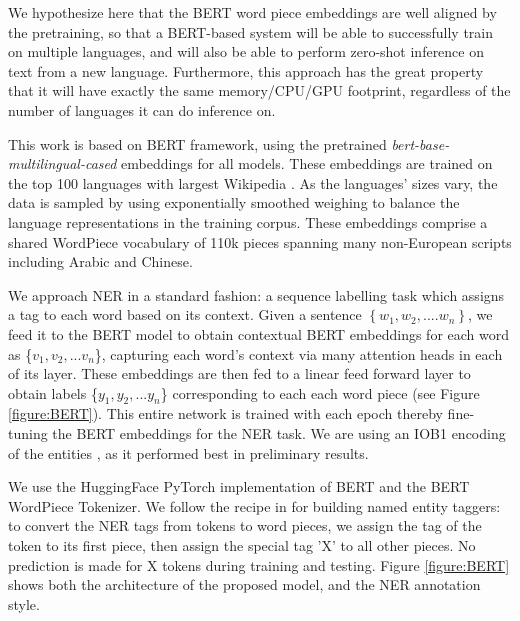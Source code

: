 \documentclass[letterpaper]{article} \usepackage{aaai20}  \usepackage{times}  \usepackage{helvet} \usepackage{courier}  \usepackage[hyphens]{url}  \usepackage{graphicx} \urlstyle{rm} \def\UrlFont{\rm}  \usepackage{graphicx}  \frenchspacing  \setlength{\pdfpagewidth}{8.5in}  \setlength{\pdfpageheight}{11in}  \usepackage{amsmath}
\begin{document}
We hypothesize here that the BERT word piece embeddings are well
aligned by the pretraining, so that a BERT-based system will be able to
successfully train on multiple languages, and will also be able to
perform zero-shot inference on text from a new language. Furthermore,
this approach has the great property that it will have exactly the
same memory/CPU/GPU footprint, regardless of the number of languages
it can do inference on.

This work is based on \cite{BERT18} BERT framework, using the
pretrained \textit{bert-base-multilingual-cased} embeddings for all
models. These embeddings are trained on the top 100 languages with largest
Wikipedia \cite{google-research18:_tensor_bert}. As the languages'
sizes vary, the data is sampled by using exponentially smoothed
weighing to balance the language representations in the training
corpus. These embeddings comprise a shared WordPiece vocabulary
of 110k pieces spanning many non-European scripts including Arabic and Chinese.


We approach NER in a standard fashion: a sequence labelling task which
assigns a tag to each word based on its context. Given a sentence
$\left\{w_{1},w_{2},....w_{n}\right\}$, we feed it to the BERT model
to obtain contextual BERT embeddings for each word as
\{$v_{1},v_{2},...v_{n}$\}, capturing each word's context via many
attention heads in each of its layer. These embeddings are then fed to
a linear feed forward layer to obtain labels
\{$y_{1},y_{2},...y_{n}$\} corresponding to each each word piece (see Figure
\ref{figure:BERT}). This entire network is trained with each epoch
thereby fine-tuning the BERT embeddings for the NER task. We are using
an IOB1 encoding of the entities \cite{sang99representing}, as it
performed best in preliminary results.


We use the HuggingFace PyTorch implementation of BERT
\cite{huggingface-github19} and the BERT WordPiece Tokenizer. We
follow the recipe in \cite{BERT18} for building named entity taggers:
to convert the NER tags from tokens to word pieces, we assign the tag
of the token to its first piece, then assign the special tag 'X' to
all other pieces. No prediction is made for \textquotedbl
X\textquotedbl{} tokens during training and testing. Figure
\ref{figure:BERT} shows both the architecture of the proposed model,
and the NER annotation style.
 \makeatletter
\setlength{\@fptop}{0pt}
\makeatother
\end{document}
